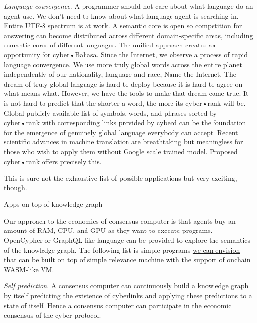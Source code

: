 \documentclass[10pt,oneside]{amsart}
\makeatletter
\def\section{\@startsection{section}{1}%
  \z@{.7\linespacing\@plus\linespacing}{.5\linespacing}%
  {\normalfont\scshape}}%
\makeatother
\begin{document}
\textit{Language convergence}. A programmer should not care about what language do an agent use. We don't need to know about what language agent is searching in. Entire UTF-8 spectrum is at work. A semantic core is open so competition for answering can become distributed across different domain-specific areas, including semantic cores of different languages. The unified approach creates an opportunity for cyber•Bahasa. Since the Internet, we observe a process of rapid language convergence. We use more truly global words across the entire planet independently of our nationality, language and race, Name the Internet. The dream of truly global language is hard to deploy because it is hard to agree on what means what. However, we have the tools to make that dream come true. It is not hard to predict that the shorter a word, the more its cyber•rank will be. Global publicly available list of symbols, words, and phrases sorted by cyber•rank with corresponding links provided by cyberd can be the foundation for the emergence of genuinely global language everybody can accept.
 Recent \href{https://ipfs.io/ipfs/QmQUWBhDMfPKgFt3NfbxM1VU22oU8CRepUzGPBDtopwap1}{scientific advances} in machine translation are breathtaking but meaningless for those who wish to apply them without Google scale trained model. Proposed cyber•rank offers precisely this.

This is sure not the exhaustive list of possible applications but very exciting, though.

\section{Apps on top of knowledge graph}\label{Apps on top of knowledge graph}

Our approach to the economics of consensus computer is that agents buy an amount of RAM, CPU, and GPU as they want to execute programs. OpenCypher or GraphQL like language can be provided to explore the semantics of the knowledge graph. The following list is simple programs \href{https://medium.com/@karpathy/software-2-0-a64152b37c35}{we can envision} that can be built on top of simple relevance machine with the support of onchain WASM-like VM.

\textit{Self prediction}. A consensus computer can continuously build a knowledge graph by itself predicting the existence of cyberlinks and applying these predictions to a state of itself. Hence a consensus computer can participate in the economic consensus of the cyber protocol.
\end{document}
